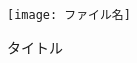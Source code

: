 \begin{figure}[htbp]
  \centering
    \texttt{[image: ファイル名]}
  \caption{タイトル} \label{ラベル}
\end{figure}
